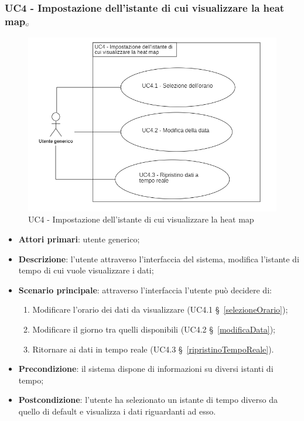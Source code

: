 \subsubsection{UC4 - Impostazione dell’istante di cui visualizzare la heat map$_{\scaleto{G}{3pt}}$
} \label{impostazioneIstanteTempo}%
\begin{center}
	\begin{figure}[H]
		\includegraphics{../immagini/attori_casi/uc4.png}
		\caption{UC4 - Impostazione dell’istante di cui visualizzare la heat map}
	\end{figure}
\end{center}
\begin{itemize}
	\item \textbf{Attori primari}: utente generico;
	\item \textbf{Descrizione}: l’utente attraverso l’interfaccia del sistema, modifica l’istante di tempo di cui vuole visualizzare i dati;
	\item \textbf{Scenario principale}: attraverso l’interfaccia l’utente può decidere di:
		\begin{enumerate}
			\item Modificare l’orario dei dati da visualizzare (UC4.1 \S~\ref{selezioneOrario});
			\item Modificare il giorno tra quelli disponibili (UC4.2 \S~\ref{modificaData});
			\item Ritornare ai dati in tempo reale (UC4.3 \S~\ref{ripristinoTempoReale}).
		\end{enumerate}
	\item \textbf{Precondizione}: il sistema dispone di informazioni su diversi istanti di tempo;
	\item \textbf{Postcondizione}: l’utente ha selezionato un istante di tempo diverso da quello di default e visualizza i dati riguardanti ad esso.%
\end{itemize}

